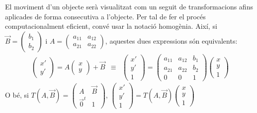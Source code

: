 \documentclass{beamer}
\begin{document}
\begin{frame}
  El moviment d'un objecte serà visualitzat com un seguit de transformacions afins aplicades de forma consecutiva a l'objecte. Per tal de fer el procés computacionalment eficient, convé usar la notació homogènia. Així, si $\overrightarrow{B}= \begin{pmatrix}b_1\\b_2\end{pmatrix}$ i $A=\begin{pmatrix}a_{11}&a_{12}\\a_{21}&a_{22}\end{pmatrix}$, aquestes dues expressions són equivalents:
  \[
    \begin{array}{ccc}
      \boxed{\begin{pmatrix}x'\\y'\end{pmatrix} = A \begin{pmatrix}x\\y\end{pmatrix} + \overrightarrow{B}} &
        \equiv &
      \boxed{\begin{pmatrix}x'\\y'\\1\end{pmatrix} = \begin{pmatrix}a_{11}&a_{12}&b_1\\a_{21}&a_{22}&b_2\\0&0&1\end{pmatrix} \begin{pmatrix}x\\y\\1\end{pmatrix}}
    \end{array}
  \]
  O bé, si $T(A,\overrightarrow{B})=\begin{pmatrix}A&\overrightarrow{B}\\\overrightarrow{0}^t&1\end{pmatrix}$, $\begin{pmatrix}x'\\y'\\1\end{pmatrix} = T(A,\overrightarrow{B}) \begin{pmatrix}x\\y\\1\end{pmatrix}$
\end{frame}
\end{document}
